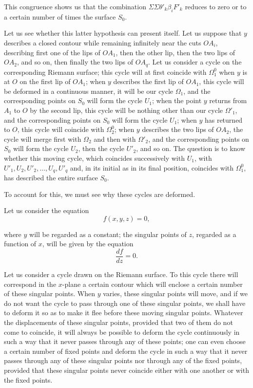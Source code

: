 \documentclass{article}
\begin{document}
This congruence shows us that the combination $\Sigma \Sigma \theta'_{k} \beta_{i}F'_{k}$ reduces to zero or to a certain number of times the surface $S_{0}$.

Let us see whether this latter hypothesis can present itself. Let us suppose that $y$ describes a closed contour while remaining infinitely near the cuts $OA_{i}$, describing first one of the lips of $OA_{1}$, then the other lip, then the two lips of $OA_{2}$, and so on, then finally the two lips of $OA_{q}$. Let us consider a cycle on the corresponding Riemann surface; this cycle will at first coincide with $\Omega^{0}_{1}$ when $y$ is at $O$ on the first lip of $OA_{1}$; when $y$ describes the first lip of $OA_{1}$, this cycle will be deformed in a continuous manner, it will be our cycle $\Omega_{1}$, and the corresponding points on $S_{0}$ will form the cycle $U_{1}$; when the point $y$ returns from $A_{1}$ to $O$ by the second lip, this cycle will be nothing other than our cycle $\Omega'_{1}$, and the corresponding points on $S_{0}$ will form the cycle $U_{1}$; when $y$ has returned to $O$, this cycle will coincide with $\Omega^{0}_{2}$; when $y$ describes the two lips of $OA_{2}$, the cycle will merge first with $\Omega_{2}$ and then with $\Omega'_{2}$, and the corresponding points on $S_{0}$ will form the cycle $U_{2}$, then the cycle $U'_{2}$, and so on. The question is to know whether this moving cycle, which coincides successively with $U_{1}$, with $U'_{1}, U_{2}, U'_{2}, \ldots, U_{q}, U'_{q}$ and, in its initial as in its final position, coincides with $\Omega^{0}_{1}$, has described the entire surface $S_{0}$.

To account for this, we must see why these cycles are deformed.

Let us consider the equation
\[ f(x, y, z) = 0, \]

where $y$ will be regarded as a constant; the singular points of $z$, regarded as a function of $x$, will be given by the equation
\[ \frac{df}{dz} = 0. \]

Let us consider a cycle drawn on the Riemann surface. To this cycle there will correspond in the $x$-plane a certain contour which will enclose a certain number of these singular points. When $y$ varies, these singular points will move, and if we do not want the cycle to pass through one of these singular points, we shall have to deform it so as to make it flee before these moving singular points. Whatever the displacements of these singular points, provided that two of them do not come to coincide, it will always be possible to deform the cycle continuously in such a way that it never passes through any of these points; one can even choose a certain number of fixed points and deform the cycle in such a way that it never passes through any of these singular points nor through any of the fixed points, provided that these singular points never coincide either with one another or with the fixed points.
\end{document}
